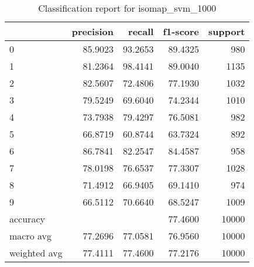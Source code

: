 \begin{table}[htb!]
\centering
\begin{tabular}{lrrrr}
    \toprule
    & precision & recall & f1-score & support \\
    \midrule
    0 & 85.9023 & 93.2653 & 89.4325 & 980 \\
    1 & 81.2364 & 98.4141 & 89.0040 & 1135 \\
    2 & 82.5607 & 72.4806 & 77.1930 & 1032 \\
    3 & 79.5249 & 69.6040 & 74.2344 & 1010 \\
    4 & 73.7938 & 79.4297 & 76.5081 & 982 \\
    5 & 66.8719 & 60.8744 & 63.7324 & 892 \\
    6 & 86.7841 & 82.2547 & 84.4587 & 958 \\
    7 & 78.0198 & 76.6537 & 77.3307 & 1028 \\
    8 & 71.4912 & 66.9405 & 69.1410 & 974 \\
    9 & 66.5112 & 70.6640 & 68.5247 & 1009 \\
    accuracy & & & 77.4600 & 10000 \\
    macro avg & 77.2696 & 77.0581 & 76.9560 & 10000 \\
    weighted avg & 77.4111 & 77.4600 & 77.2176 & 10000 \\
    \bottomrule
\end{tabular}
\caption{Classification report for isomap_svm_1000}
\label{tab:classification-report-isomap_svm_1000}
\end{table}
